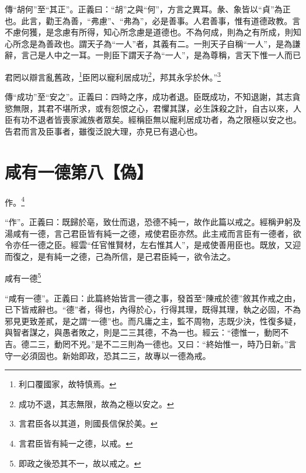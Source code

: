 {\noindent\zhuan{}\fzbyks 傳“胡何”至“其正”。正義曰：“胡”之與“何”，方言之異耳。彖、象皆以“貞”為正也。此言，勸王為善，“弗慮”、“弗為”，必是善事。人君善事，惟有道德政教。言不慮何獲，是念慮有所得，知心所念慮是道德也。不為何成，則為之有所成，則知心所念是為善政也。謂天子為“一人”者，其義有二。一則天子自稱“一人”，是為謙辭，言己是人中之一耳。一則臣下謂天子為“一人”，是為尊稱，言天下惟一人而已 \par}

君罔以辯言亂舊政，\footnote{利口覆國家，故特慎焉。}臣罔以寵利居成功\footnote{成功不退，其志無限，故為之極以安之。}，邦其永孚於休。”\footnote{言君臣各以其道，則國長信保於美。}

{\noindent\zhuan{}\fzbyks 傳“成功”至“安之”。正義曰：四時之序，成功者退。臣既成功，不知退謝，其志貪慾無限，其君不堪所求，或有怨恨之心，君懼其謀，必生誅殺之計，自古以來，人臣有功不退者皆喪家滅族者眾矣。經稱臣無以寵利居成功者，為之限極以安之也。告君而言及臣事者，雖復泛說大理，亦見已有退心也。 \par}

\section{咸有一德第八【偽】}


作。\footnote{言君臣皆有純一之德，以戒。}

{\noindent\shu{}\fzkt “作”。正義曰：既歸於亳，致仕而退，恐德不純一，故作此篇以戒之。經稱尹躬及湯咸有一德，言己君臣皆有純一之德，戒使君臣亦然。此主戒而言臣有一德者，欲令亦任一德之臣。經雲“任官惟賢材，左右惟其人”，是戒使善用臣也。既放，又迎而復之，是有純一之德，己為所信，是己君臣純一，欲令法之。 \par}

咸有一德\footnote{即政之後恐其不一，故以戒之。}

{\noindent\shu{}\fzkt “咸有一德”。正義曰：此篇終始皆言一德之事，發首至“陳戒於德”敘其作戒之由，已下皆戒辭也。“德”者，得也，內得於心，行得其理，既得其理，執之必固，不為邪見更致差貳，是之謂“一德”也。而凡庸之主，監不周物，志既少決，性復多疑，與智者謀之，與愚者敗之，則是二三其德，不為一也。經云：“德惟一，動罔不吉。德二三，動罔不兇。”是不二三則為一德也。又曰：“終始惟一，時乃日新。”言守一必須固也。新始即政，恐其二三，故專以一德為戒。 \par}

